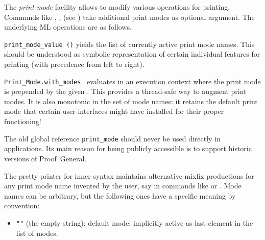 \begin{isabellebody}
\begin{isamarkuptext}
  The \emph{print mode} facility allows to modify various operations
  for printing.  Commands like \hyperlink{command.typ}{\mbox{}}, \hyperlink{command.term}{\mbox{}},
  \hyperlink{command.thm}{\mbox{}} (see ) take additional print
  modes as optional argument.  The underlying ML operations are as
  follows.

  \begin{description}

  \item \verb|print_mode_value ()| yields the list of currently
  active print mode names.  This should be understood as symbolic
  representation of certain individual features for printing (with
  precedence from left to right).

  \item \verb|Print_Mode.with_modes|~ evaluates
   in an execution context where the print mode is
  prepended by the given .  This provides a thread-safe
  way to augment print modes.  It is also monotonic in the set of mode
  names: it retains the default print mode that certain
  user-interfaces might have installed for their proper functioning!

  \end{description}

  \begin{warn}
  The old global reference \verb|print_mode| should never be used
  directly in applications.  Its main reason for being publicly
  accessible is to support historic versions of Proof~General.
  \end{warn}

  \medskip The pretty printer for inner syntax maintains alternative
  mixfix productions for any print mode name invented by the user, say
  in commands like \hyperlink{command.notation}{\mbox{}} or \hyperlink{command.abbreviation}{\mbox{}}.
  Mode names can be arbitrary, but the following ones have a specific
  meaning by convention:

  \begin{itemize}

  \item \verb|""| (the empty string): default mode;
  implicitly active as last element in the list of modes.


\end{itemize}
\end{isamarkuptext}
\end{isabellebody}
